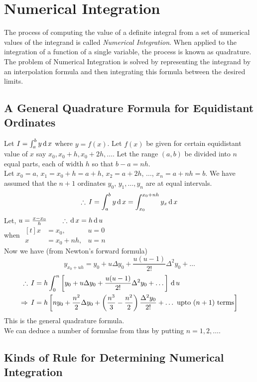 \documentclass[12pt,class=book,crop=false]{standalone}
\begin{document}
\chapter{Numerical Integration}
The process of computing the value of a definite integral from a set of numerical values of the integrand is called \emph{Numerical Integration}. When applied to the integration of a function of a single variable, the process is known as quadrature.\\

The problem of Numerical Integration is solved by representing the integrand by an interpolation formula and then integrating this formula between the desired limits.
\section{A General Quadrature Formula for Equidistant Ordinates}
Let $ I=\int_a^b y\,\mathrm{d}\, x  $ where $ y=f(x) $. Let $ f(x) $ be given for certain equidistant value of $ x $ say $ x_0,x_0+h,x_0+2h,\dots $. Let the range $ (a,b) $ be divided into $ n $ equal parts, each of width $ h $ so that $ b-a=nh $.\\
Let $ x_0=a$, $x_1=x_0+h=a+h$, $x_2=a+2h$, $\dots$, $x_n=a+nh=b $. We have assumed that the $ n+1 $ ordinates $ y_0,\,y_1,\dots,y_n $ are at equal intervals.
\[
    \therefore\, I=\int_a^b y\,\mathrm{d}\, x=\int_{x_0}^{x_0+nh} y_x \,\mathrm{d}\, x
\]
Let, $ u=\frac{x-x_0}{h}\qquad \therefore \,\mathrm{d}\, x=h \,\mathrm{d}\, u $\\
when $ \begin{aligned}[t]
        x & =x_0,    & u=0 \\
        x & =x_0+nh, & u=n
    \end{aligned} $\\
Now we have (from Newton's forward formula)
\[
    y_{x_0+uh}=y_0+u\Delta y_0+\frac{u(u-1)}{2!}\Delta^2 y_0+\dots
\]
\begin{align}
    \therefore\,I  & =h\int_0^n \left[ y_0+u\Delta y_0+\frac{u(u-1)}{2!}\Delta^2 y_0+\dots \right]\,\mathrm{d}\, u\notag                 \\
    \Rightarrow\,I & =h\left[ ny_0+\frac{n^2}{2}\Delta y_0+\left( \frac{n^3}{3}-\frac{n^2}{2} \right)\frac{\Delta^2 y_0}{2!}
        +\dots \text{ upto $ (n+1)$ terms}\right] \label{eq:quad1}
\end{align}
This is the general quadrature formula.\\
We can deduce a number of formulae from thus by putting $ n=1,2,\dots $.
\section{Kinds of Rule for Determining Numerical Integration}
\end{document}
